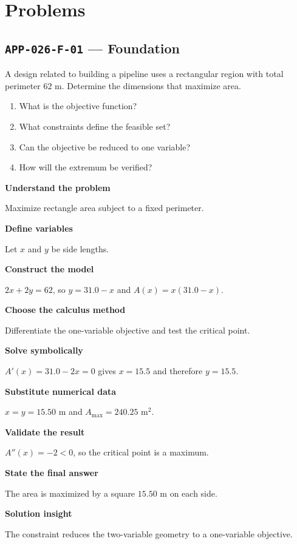 \documentclass[11pt]{book}
\newcommand{\pid}[1]{\texttt{#1}}
\begin{document}
\section*{Problems}
\subsection*{\pid{APP-026-F-01} — Foundation}
\begin{problembox}
A design related to building a pipeline uses a rectangular region with total perimeter 62 m. Determine the dimensions that maximize area.
\end{problembox}
\begin{promptbox}\begin{enumerate}
\item What is the objective function?
\item What constraints define the feasible set?
\item Can the objective be reduced to one variable?
\item How will the extremum be verified?
\end{enumerate}\end{promptbox}
\begin{solutionbox}
\textbf{Understand the problem}\par Maximize rectangle area subject to a fixed perimeter.\par\medskip
\textbf{Define variables}\par Let $x$ and $y$ be side lengths.\par\medskip
\textbf{Construct the model}\par $2x+2y=62$, so $y=31.0-x$ and $A(x)=x(31.0-x)$.\par\medskip
\textbf{Choose the calculus method}\par Differentiate the one-variable objective and test the critical point.\par\medskip
\textbf{Solve symbolically}\par $A'(x)=31.0-2x=0$ gives $x=15.5$ and therefore $y=15.5$.\par\medskip
\textbf{Substitute numerical data}\par $x=y=15.50$ m and $A_{\max}=240.25$ m$^2$.\par\medskip
\textbf{Validate the result}\par $A''(x)=-2<0$, so the critical point is a maximum.\par\medskip
\textbf{State the final answer}\par The area is maximized by a square $15.50$ m on each side.\par\medskip
\textbf{Solution insight}\par The constraint reduces the two-variable geometry to a one-variable objective.\par\medskip
\end{solutionbox}
\end{document}

